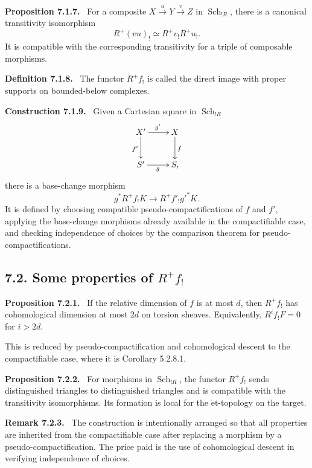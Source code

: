 \documentclass[12pt]{article}
\DeclareMathOperator{\Sch}{Sch}
\newcommand{\et}{\mathrm{\acute et}}
\newenvironment{statement}[1]{\par\medskip\noindent\textbf{#1.}\ }{\par\medskip}
\newenvironment{remarktext}[1]{\par\medskip\noindent\textbf{#1.}\ }{\par\medskip}
\begin{document}
\begin{statement}{Proposition 7.1.7}
For a composite \(X\xrightarrow{u}Y\xrightarrow{v}Z\) in \(\Sch_{!R}\), there is a canonical transitivity isomorphism
\[
R^+(vu)_!\simeq R^+v_!R^+u_!.
\]
It is compatible with the corresponding transitivity for a triple of composable morphisms.
\end{statement}

\begin{statement}{Definition 7.1.8}
The functor \(R^+f_!\) is called the direct image with proper supports on bounded-below complexes.
\end{statement}

\begin{statement}{Construction 7.1.9}
Given a Cartesian square in \(\Sch_{!R}\)
\[
\xymatrix{X'\ar[r]^{g'}\ar[d]_{f'}&X\ar[d]^f\\S'\ar[r]_g&S,}
\]
there is a base-change morphism
\[
g^*R^+f_!K\longrightarrow R^+f'_!g'^*K.
\]
It is defined by choosing compatible pseudo-compactifications of \(f\) and \(f'\), applying the base-change morphisms already available in the compactifiable case, and checking independence of choices by the comparison theorem for pseudo-compactifications.
\end{statement}

\subsection*{7.2. Some properties of \(R^+f_!\)}

\begin{statement}{Proposition 7.2.1}
If the relative dimension of \(f\) is at most \(d\), then \(R^+f_!\) has cohomological dimension at most \(2d\) on torsion sheaves. Equivalently, \(R^if_!F=0\) for \(i>2d\).
\end{statement}

This is reduced by pseudo-compactification and cohomological descent to the compactifiable case, where it is Corollary 5.2.8.1.

\begin{statement}{Proposition 7.2.2}
For morphisms in \(\Sch_{!R}\), the functor \(R^+f_!\) sends distinguished triangles to distinguished triangles and is compatible with the transitivity isomorphisms. Its formation is local for the \(\et\)-topology on the target.
\end{statement}

\begin{remarktext}{Remark 7.2.3}
The construction is intentionally arranged so that all properties are inherited from the compactifiable case after replacing a morphism by a pseudo-compactification. The price paid is the use of cohomological descent in verifying independence of choices.
\end{remarktext}
\end{document}
